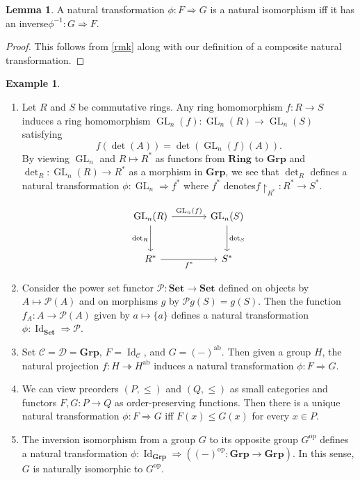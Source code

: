 \documentclass[10pt,letterpaper,cm]{nupset}
\theoremstyle{definition}
\newtheorem{exmp}[definition]{Example}
\theoremstyle{theorem}
\newtheorem{lemma}[definition]{Lemma}
\theoremstyle{remark}
\renewcommand{\P}{\mathcal P}
\newcommand{\1}{\mathbf{1}}
\renewcommand{\c}{\mathscr{C}}
\renewcommand{\d}{\mathscr{D}}
\newcommand{\0}{\vec 0}
\DeclareMathOperator*{\GL}{GL}
\DeclareMathOperator{\id}{Id}
\DeclareMathOperator{\op}{op}
\DeclareMathOperator{\ab}{ab}
\begin{document}
\begin{lemma}
A natural transformation $\phi: F \Rightarrow G$ is a natural isomorphism iff it has an inverse\linebreak $\phi^{{-1}} : G \Rightarrow F$.
\end{lemma}
\begin{proof}
This follows from \cref{rmk} along with our definition of a composite natural transformation.
\end{proof}

\begin{exmp} $ $
\begin{enumerate}
\item Let $R$ and $S$ be commutative rings. Any ring homomorphism $f: R \to S$ induces a ring homomorphism $\GL_n(f): \GL_n(R) \to \GL_n(S)$ satisfying $$f(\det(A)) = \det\left(\GL_{n}(f)(A)\right).$$ By viewing $\GL_n$ and $R \mapsto R^{\ast}$ as functors from $\mathbf{Ring}$ to $\mathbf{Grp}$ and $\det_R : \GL_n(R) \to R^{\ast}$ as a morphism in $\mathbf{Grp}$, we see that $\det_R$ defines a natural transformation $\phi : \GL_n \Rightarrow f^{\ast}$ where $f^{\ast}$ denotes\linebreak $f\restriction_{R^{\ast}} :R^{\ast} \to S^{\ast}$.  

\[
\begin{tikzcd}[row sep=large, column sep = large]
\GL_n(R) \arrow[r, "\GL_n(f)"] \arrow[d, "\det_R", swap]
& \GL_n(S) \arrow[d, "\det_S"] \\
R^{\ast} \arrow[r, "f^{\ast}"']
& S^{\ast}
\end{tikzcd}
\]
\item Consider the power set functor $\P: \mathbf{Set} \to \mathbf{Set}$ defined  on objects  by $A \mapsto \P(A)$ and on morphisms $g$  by $\P{g}(S) = g(S)$. Then the function $f_A: A \to \P(A)$ given by $a \mapsto \{a\}$ defines a natural transformation $\phi: \id_{\mathbf{Set}} \Rightarrow \P$.
\item 
Set $\c = \d = \mathbf{Grp}$, $F= \id_{\c}$, and $G =(-)^{\ab}$. Then given a group $H$, the natural projection $f: H \twoheadrightarrow H^{\ab}$ induces a natural transformation $\phi: F \Rightarrow G$.
\item 
We can view preorders $\left(P, \leq\right)$ and $\left(Q, \leq\right)$ as small categories and functors $F, G: P \to Q$ as order-preserving functions. Then there is a unique natural transformation $\phi: F \Rightarrow G$ iff $F(x) \leq G(x)$ for every $x\in P$.
\item 
The inversion isomorphism from a group $G$ to its opposite group $G^{\op}$ defines a natural transformation $\phi: \id_{\mathbf{Grp}} \Rightarrow \left((-)^{\op}: \mathbf{Grp} \to \mathbf{Grp}\right)$. In this sense, $G$ is naturally isomorphic to $G^{\op}$.
\end{enumerate}
\end{exmp}
\end{document}
